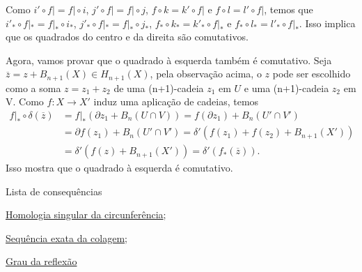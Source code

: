 \begin{dem}
    Como $i'\circ f|=f|\circ i$, $j'\circ f|=f|\circ j$, $f\circ k=k'\circ f|$ e $f\circ l=l'\circ f|$, temos que $i'_*\circ f|_*=f|_*\circ i_*$, $j'_*\circ f|_*=f|_*\circ j_*$, $f_*\circ k_*=k'_*\circ f|_*$ e $f_*\circ l_*=l'_*\circ f|_*$. Isso implica que os quadrados do centro e da direita são comutativos.

    Agora, vamos provar que o quadrado à esquerda também é comutativo. Seja $\overline{z}=z+B_{n+1}(X)\in H_{n+1}(X)$, pela observação acima, o $z$ pode ser escolhido como a soma $z=z_1+z_2$ de uma (n+1)-cadeia $z_1$ em $U$ e uma (n+1)-cadeia $z_2$ em V. Como $f:X\rightarrow X'$ induz uma aplicação de cadeias, temos 
    \begin{align*}
        f|_*\circ \delta(\overline{z}) & =f|_*(\partial z_1+B_{n}(U\cap V))=f(\partial z_1)+B_n(U'\cap V')\\
        &=\partial f(z_1)+B_n(U'\cap V')=\delta'(f(z_1)+f(z_2)+B_{n+1}(X'))\\
        &=\delta'(f(z)+B_{n+1}(X'))=\delta'(f_*(\overline{z})).
    \end{align*}
    Isso mostra que o quadrado à esquerda é comutativo.
\end{dem}
\begin{titlemize}{Lista de consequências}
    \item \hyperref[homologia-singular-de-S1-prop]{Homologia singular da circunferência};\\
    \item \hyperref[sequencia-exata-da-colagem-prop]{Sequência exata da colagem};\\
    \item \hyperref[grau-da-reflexao-prop]{Grau da reflexão}
\end{titlemize}
